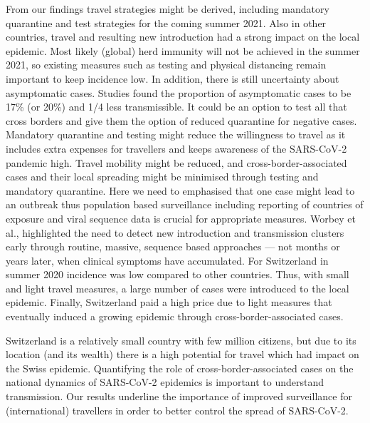 \documentclass[10pt, a4paper, twoside]{article}
\begin{document}
\begin{multicols}{2}
From our findings travel strategies might be derived, including mandatory quarantine and test strategies for the coming summer 2021.
Also in other countries, travel and resulting new introduction had a strong impact on the local epidemic.\cite{worobey_emergence_2020,russell_effect_2021,hodcroft_emergence_2020}
Most likely (global) herd immunity will not be achieved in the summer 2021, so existing measures such as testing and physical distancing remain important to keep incidence low.
In addition, there is still uncertainty about asymptomatic cases.\cite{nogrady_what_2020,buitrago-garcia_occurrence_2020}
Studies found the proportion of asymptomatic cases to be 17\% (or 20\%) and 1/4 less transmissible.\cite{byambasuren_estimating_2020,buitrago-garcia_occurrence_2020,bi_household_2020}
It could be an option to test all that cross borders and give them the option of reduced quarantine for negative cases.\cite{ashcroft_quantifying_2021}
Mandatory quarantine and testing might reduce the willingness to travel as it includes extra expenses for travellers and keeps awareness of the SARS-CoV-2 pandemic high.
Travel mobility might be reduced, and cross-border-associated cases and their local spreading might be minimised through testing and mandatory quarantine.
Here we need to emphasised that one case might lead to an outbreak thus population based surveillance including reporting of countries of exposure and viral sequence data is crucial for appropriate measures.\cite{worobey_emergence_2020}
Worbey et al., highlighted the need to detect new introduction and transmission clusters early through routine, massive, sequence based approaches — not months or years later, when clinical symptoms have accumulated.\cite{worobey_emergence_2020}
For Switzerland in summer 2020 incidence was low compared to other countries.
Thus, with small and light travel measures, a large number of cases were introduced to the local epidemic.
Finally, Switzerland paid a high price due to light measures that eventually induced a growing epidemic through cross-border-associated cases.
\break
\par
Switzerland is a relatively small country with few million citizens, but due to its location (and its wealth) there is a high potential for travel which had impact on the Swiss epidemic.
Quantifying the role of cross-border-associated cases on the national dynamics of SARS-CoV-2 epidemics is important to understand transmission.
Our results underline the importance of improved surveillance for (international) travellers in order to better control the spread of SARS-CoV-2.



\end{multicols}
\end{document}
